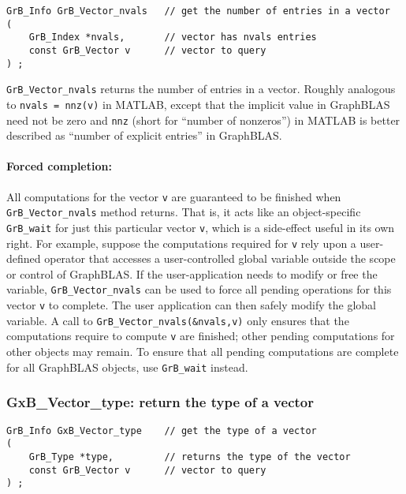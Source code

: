 \documentclass[12pt]{article}
\begin{document}
\begin{mdframed}[userdefinedwidth=6in]
{\footnotesize
\begin{verbatim}
GrB_Info GrB_Vector_nvals   // get the number of entries in a vector
(
    GrB_Index *nvals,       // vector has nvals entries
    const GrB_Vector v      // vector to query
) ;
\end{verbatim}
} \end{mdframed}

\verb'GrB_Vector_nvals' returns the number of entries in a vector.  Roughly
analogous to \verb'nvals = nnz(v)' in MATLAB, except that the implicit value in
GraphBLAS need not be zero and \verb'nnz' (short for ``number of nonzeros'') in
MATLAB is better described as ``number of explicit entries'' in GraphBLAS.

\paragraph{Forced completion:}
All computations for the vector \verb'v' are guaranteed to be finished when
\verb'GrB_Vector_nvals' method returns.
%
That is, it acts like an object-specific \verb'GrB_wait' for just this
particular vector \verb'v', which is a side-effect useful in its own right.
For example, suppose the computations required for \verb'v' rely upon a
user-defined operator that accesses a user-controlled global variable outside
the scope or control of GraphBLAS.  If the user-application needs to modify or
free the variable, \verb'GrB_Vector_nvals' can be used to force all pending
operations for this vector \verb'v' to complete.  The user application can then
safely modify the global variable.  A call to \verb'GrB_Vector_nvals(&nvals,v)'
only ensures that the computations require to compute \verb'v' are finished;
other pending computations for other objects may remain.  To ensure that all
pending computations are complete for all GraphBLAS objects, use
\verb'GrB_wait' instead.

\newpage
\subsubsection{{\sf GxB\_Vector\_type:}          return the type of a vector}
\label{vector_type}

\begin{mdframed}[userdefinedwidth=6in]
{\footnotesize
\begin{verbatim}
GrB_Info GxB_Vector_type    // get the type of a vector
(
    GrB_Type *type,         // returns the type of the vector
    const GrB_Vector v      // vector to query
) ;
\end{verbatim}
} \end{mdframed}
\end{document}
